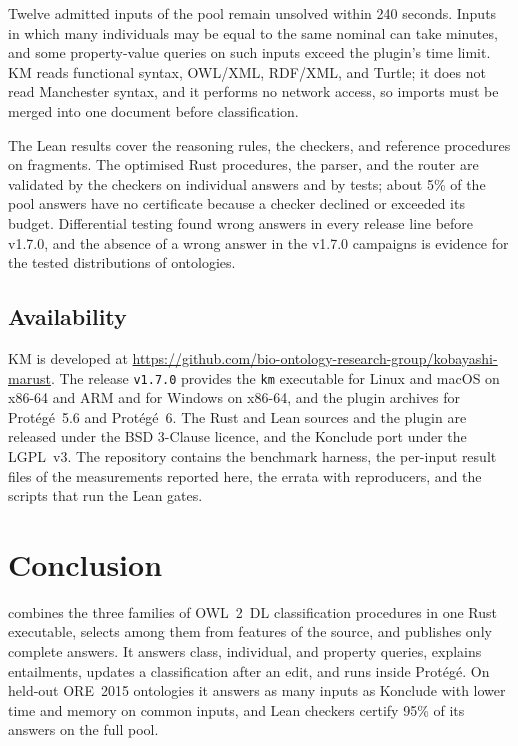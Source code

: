 Twelve admitted inputs of the pool remain unsolved within 240 seconds.  Inputs
in which many individuals may be equal to the same nominal can take minutes,
and some property-value queries on such inputs exceed the plugin's time limit.
KM reads functional syntax, OWL/XML, RDF/XML, and Turtle; it does not read
Manchester syntax, and it performs no network access, so imports must be
merged into one document before classification.

The Lean results cover the reasoning rules, the checkers, and reference
procedures on fragments.  The optimised Rust procedures, the parser, and the
router are validated by the checkers on individual answers and by tests; about
5\% of the pool answers have no certificate because a checker declined or
exceeded its budget.  Differential testing found wrong answers in every release
line before v1.7.0, and the absence of a wrong answer in the v1.7.0 campaigns
is evidence for the tested distributions of ontologies.

\subsection{Availability}
\label{sec:availability}

KM is developed at
\url{https://github.com/bio-ontology-research-group/kobayashi-marust}.  The
release \texttt{v1.7.0} provides the \texttt{km} executable for Linux and macOS
on x86-64 and ARM and for Windows on x86-64, and the plugin archives for
Prot\'eg\'e~5.6 and Prot\'eg\'e~6.  The Rust and Lean sources and the plugin are
released under the BSD 3-Clause licence, and the Konclude port under the
LGPL~v3.  The repository contains the benchmark harness, the per-input result
files of the measurements reported here, the errata with reproducers, and the
scripts that run the Lean gates.  

\section{Conclusion}

\KM{} combines the three families of OWL~2~DL classification procedures in one
Rust executable, selects among them from features of the source, and publishes
only complete answers.  It answers class, individual, and property queries,
explains entailments, updates a classification after an edit, and runs inside
Prot\'eg\'e.  On held-out ORE~2015 ontologies it answers as many inputs as
Konclude with lower time and memory on common inputs, and Lean checkers certify
95\% of its answers on the full pool.
